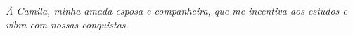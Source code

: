 \begin{dedicatoria}
	\vspace*{\fill}
	\centering
	\noindent
	\textit{
		À Camila, minha amada esposa e companheira, que me incentiva aos estudos e vibra com nossas conquistas.
	}
	\vspace*{\fill}
\end{dedicatoria}